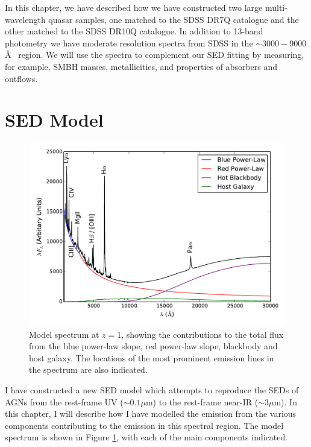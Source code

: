 In this chapter, we have described how we have constructed two large multi-wavelength quasar samples, one matched to the SDSS DR7Q catalogue and the other matched to the SDSS DR10Q catalogue. In addition to 13-band photometry we have moderate resolution spectra from SDSS in the $\sim 3000 - 9000$\AA~ region. We will use the spectra to complement our SED fitting by measuring, for example, SMBH masses, metallicities, and properties of absorbers and outflows.  

\newpage

\section{SED Model}
\label{chapter:sedmodel}

\begin{figure}[h]
  \centering
  \includegraphics[width=\textwidth]{figures/chapter06/modelsed}
  \caption{Model spectrum at $z=1$, showing the contributions to the total flux from the blue power-law slope, red power-law slope, blackbody and host galaxy. The locations of the most prominent emission lines in the spectrum are also indicated. }
  \label{fig:modelsed}
\end{figure}

I have constructed a new SED model which attempts to reproduce the SEDs of AGNs from the rest-frame UV ($\sim 0.1 \mu$m) to the rest-frame near-IR ($\sim 3 \mu$m). In this chapter, I will describe how I have modelled the emission from the various components contributing to the emission in this spectral region. The model spectrum is shown in Figure \ref{fig:modelsed}, with each of the main components indicated. 

